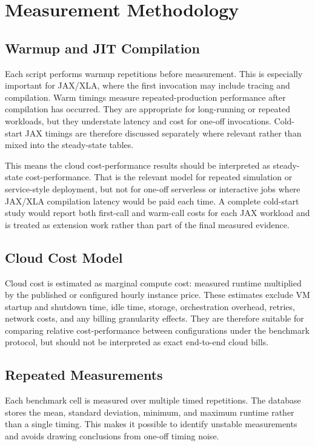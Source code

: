 \section{Measurement Methodology}
\label{sec:exp-methodology}

\subsection{Warmup and JIT Compilation}

Each script performs warmup repetitions before measurement.  This is
especially important for JAX/XLA, where the first invocation may include
tracing and compilation. Warm timings measure repeated-production performance
after compilation has occurred. They are appropriate for long-running or
repeated workloads, but they understate latency and cost for one-off
invocations. Cold-start JAX timings are therefore discussed separately where
relevant rather than mixed into the steady-state tables.

This means the cloud cost-performance results should be interpreted as
steady-state cost-performance. That is the relevant model for repeated
simulation or service-style deployment, but not for one-off serverless or
interactive jobs where JAX/XLA compilation latency would be paid each time. A
complete cold-start study would report both first-call and warm-call costs for
each JAX workload and is treated as extension work rather than part of the
final measured evidence.


\subsection{Cloud Cost Model}

Cloud cost is estimated as marginal compute cost: measured runtime multiplied
by the published or configured hourly instance price. These estimates exclude
VM startup and shutdown time, idle time, storage, orchestration overhead,
retries, network costs, and any billing granularity effects. They are therefore
suitable for comparing relative cost-performance between configurations under
the benchmark protocol, but should not be interpreted as exact end-to-end cloud
bills.

\subsection{Repeated Measurements}

Each benchmark cell is measured over multiple timed repetitions.  The
database stores the mean, standard deviation, minimum, and maximum runtime
rather than a single timing.  This makes it possible to identify unstable
measurements and avoids drawing conclusions from one-off timing noise.

